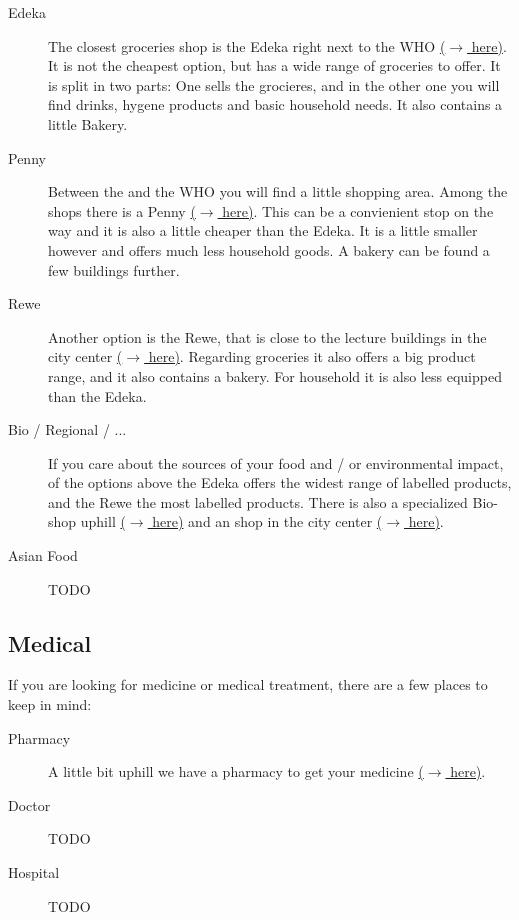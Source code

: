 \begin{description}
    \item[Edeka]
    The closest groceries shop is the Edeka right next to the WHO \href{https://maps.app.goo.gl/DTd9KutteiG8m5L1A}{($\xrightarrow{}$ here)}. It is not the cheapest option, but has a wide range of groceries to offer. It is split in two parts: One sells the grocieres, and in the other one you will find drinks, hygene products and basic household needs. It also contains a little Bakery.

    \item[Penny]
    Between the  and the WHO you will find a little shopping area. Among the shops there is a Penny \href{https://maps.app.goo.gl/7F1s1fUtsefv49gv8}{($\xrightarrow{}$ here)}. This can be a convienient stop on the way and it is also a little cheaper than the Edeka. It is a little smaller however and offers much less household goods. A bakery can be found a few buildings further.

    \item[Rewe]
    Another  option is the Rewe, that is close to the lecture buildings in the city center \href{https://maps.app.goo.gl/Sj6d82QsJSTaGCuv5}{($\xrightarrow{}$ here)}. Regarding groceries it also offers a big product range, and it also contains a bakery. For household it is also less equipped than the Edeka.

    \item[Bio / Regional / ...]
    If you care about the sources of your food and / or environmental impact, of the options above the Edeka offers the widest range of  labelled products, and the Rewe the most  labelled products. There is also a specialized Bio-shop uphill \href{https://maps.app.goo.gl/EEEsyTK1hGbJ5H1B6}{($\xrightarrow{}$ here)} and an  shop in the city center \href{https://maps.app.goo.gl/8ppTPAT6ZfP2TXeg6}{($\xrightarrow{}$ here)}.

    \item[Asian Food]
    {\color{darkred} TODO}
\end{description}

\subsection{Medical}
If you are looking for medicine or medical treatment, there are a few places to keep in mind:

\begin{description}
    \item[Pharmacy]
    A little bit uphill we have a pharmacy to get your medicine \href{https://maps.app.goo.gl/cpDLc9VZ7XukpgS18}{($\xrightarrow{}$ here)}.
    \item[Doctor]
    {\color{darkred} TODO}
    \item[Hospital]
    {\color{darkred} TODO}
\end{description}

